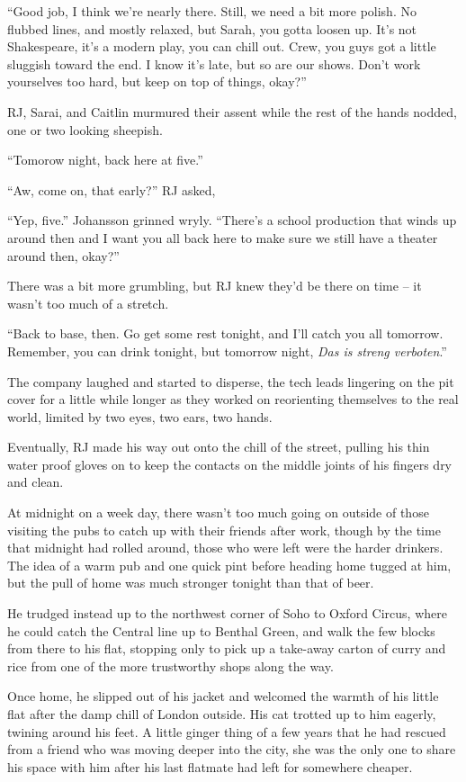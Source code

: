 ``Good job, I think we're nearly there.  Still, we need a bit more polish.  No flubbed lines, and mostly relaxed, but Sarah, you gotta loosen up.  It's not Shakespeare, it's a modern play, you can chill out.  Crew, you guys got a little sluggish toward the end.  I know it's late, but so are our shows.  Don't work yourselves too hard, but keep on top of things, okay?''

RJ, Sarai, and Caitlin murmured their assent while the rest of the hands nodded, one or two looking sheepish.

``Tomorow night, back here at five.''

``Aw, come on, that early?'' RJ asked,

``Yep, five.''  Johansson grinned wryly.  ``There's a school production that winds up around then and I want you all back here to make sure we still have a theater around then, okay?''

There was a bit more grumbling, but RJ knew they'd be there on time -- it wasn't too much of a stretch.

``Back to base, then.  Go get some rest tonight, and I'll catch you all tomorrow.  Remember, you can drink tonight, but tomorrow night, \textit{Das is streng verboten}.''

The company laughed and started to disperse, the tech leads lingering on the pit cover for a little while longer as they worked on reorienting themselves to the real world, limited by two eyes, two ears, two hands.

Eventually, RJ made his way out onto the chill of the street, pulling his thin water proof gloves on to keep the contacts on the middle joints of his fingers dry and clean.

At midnight on a week day, there wasn't too much going on outside of those visiting the pubs to catch up with their friends after work, though by the time that midnight had rolled around, those who were left were the harder drinkers.  The idea of a warm pub and one quick pint before heading home tugged at him, but the pull of home was much stronger tonight than that of beer.

He trudged instead up to the northwest corner of Soho to Oxford Circus, where he could catch the Central line up to Benthal Green, and walk the few blocks from there to his flat, stopping only to pick up a take-away carton of curry and rice from one of the more trustworthy shops along the way.

Once home, he slipped out of his jacket and welcomed the warmth of his little flat after the damp chill of London outside.  His cat trotted up to him eagerly, twining around his feet.  A little ginger thing of a few years that he had rescued from a friend who was moving deeper into the city, she was the only one to share his space with him after his last flatmate had left for somewhere cheaper.

